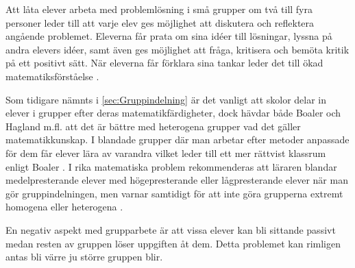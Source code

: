 \textcolor{turkos} {
    Att låta elever arbeta med problemlösning i små grupper om två till fyra personer leder till att varje elev ges möjlighet att diskutera och reflektera angående problemet. Eleverna får prata om sina idéer till lösningar, lyssna på andra elevers idéer, samt även ges möjlighet att fråga, kritisera och bemöta kritik på ett positivt sätt. När eleverna får förklara sina tankar leder det till ökad matematiksförståelse \cite{RikaProblem}.
}

\textcolor{turkos} {
Som tidigare nämnts i \ref{sec:Gruppindelning} är det vanligt att skolor delar in elever i grupper efter deras matematikfärdigheter, dock hävdar både Boaler \cite{TheElephant} och Hagland m.fl. \cite{RikaProblem} att det är bättre med heterogena grupper vad det gäller matematikkunskap. I blandade grupper där man arbetar efter metoder anpassade för dem får elever lära av varandra vilket leder till ett mer rättvist klassrum enligt Boaler \cite{TheElephant}. 
}
\textcolor{turkos} {
I rika matematiska problem rekommenderas att läraren blandar medelpresterande elever med högepresterande eller lågpresterande elever när man gör gruppindelningen, men varnar samtidigt för att inte göra grupperna extremt homogena eller heterogena \cite{RikaProblem}.
}




\textcolor{turkos} {
En negativ aspekt med grupparbete är att vissa elever kan bli sittande passivt medan resten av gruppen löser uppgiften åt dem\cite{RikaProblem}. Detta problemet kan rimligen antas bli värre ju större gruppen blir. 
}











